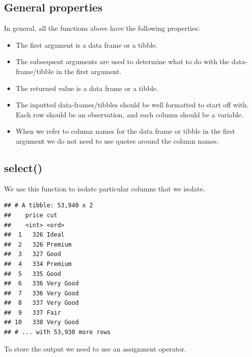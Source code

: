 \documentclass[
]{book}
\newenvironment{Shaded}{\begin{snugshade}}{\end{snugshade}}
\newcommand{\KeywordTok}[1]{\textcolor[rgb]{0.13,0.29,0.53}{\textbf{#1}}}
\newcommand{\NormalTok}[1]{#1}
\newcommand{\OperatorTok}[1]{\textcolor[rgb]{0.81,0.36,0.00}{\textbf{#1}}}
\newcommand{\StringTok}[1]{\textcolor[rgb]{0.31,0.60,0.02}{#1}}
\begin{document}
\hypertarget{general-properties}{%
\subsection{General properties}\label{general-properties}}

In general, all the functions above have the following properties:

\begin{itemize}
\item
  The first argument is a data frame or a tibble.
\item
  The subsequent arguments are used to determine what to do with the data-frame/tibble in the first argument.
\item
  The returned value is a data frame or a tibble.
\item
  The inputted data-frames/tibbles should be well formatted to start off with. Each row should be an observation, and each column should be a variable.
\item
  When we refer to column names for the data frame or tibble in the first argument we do not need to use quotes around the column names.
\end{itemize}

\hypertarget{select}{%
\subsection{select()}\label{select}}

We use this function to isolate particular columns that we isolate.

\begin{Shaded}
\end{Shaded}

\begin{verbatim}
## # A tibble: 53,940 x 2
##    price cut      
##    <int> <ord>    
##  1   326 Ideal    
##  2   326 Premium  
##  3   327 Good     
##  4   334 Premium  
##  5   335 Good     
##  6   336 Very Good
##  7   336 Very Good
##  8   337 Very Good
##  9   337 Fair     
## 10   338 Very Good
## # ... with 53,930 more rows
\end{verbatim}

To store the output we need to use an assignment operator.

\begin{Shaded}
\end{Shaded}
\end{document}
